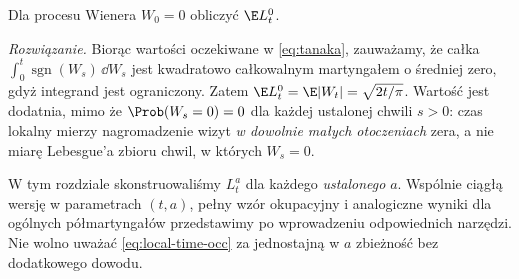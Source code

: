 \begin{zadanie}
Dla procesu Wienera $W_0=0$ obliczyć $\E L_t^0$.

\emph{Rozwiązanie.} Biorąc wartości oczekiwane w
\eqref{eq:tanaka}, zauważamy, że całka
$\int_0^t\operatorname{sgn}(W_s)\,\dd W_s$ jest
kwadratowo całkowalnym martyngałem o średniej zero,
gdyż integrand jest ograniczony. Zatem
$\E L_t^0=\E|W_t|=\sqrt{2t/\pi}$.
Wartość jest dodatnia, mimo że $\Prob(W_s=0)=0$
dla każdej ustalonej chwili $s>0$: czas lokalny
mierzy nagromadzenie wizyt \emph{w dowolnie małych
otoczeniach} zera, a nie miarę Lebesgue'a zbioru
chwil, w których $W_s=0$.
\end{zadanie}

\begin{uwaga}
W tym rozdziale skonstruowaliśmy $L_t^a$ dla każdego
\emph{ustalonego} $a$. Wspólnie ciągłą wersję w
parametrach $(t,a)$, pełny wzór okupacyjny i
analogiczne wyniki dla ogólnych półmartyngałów
przedstawimy po wprowadzeniu odpowiednich narzędzi.
Nie wolno uważać \eqref{eq:local-time-occ} za
jednostajną w $a$ zbieżność bez dodatkowego dowodu.
\end{uwaga}


